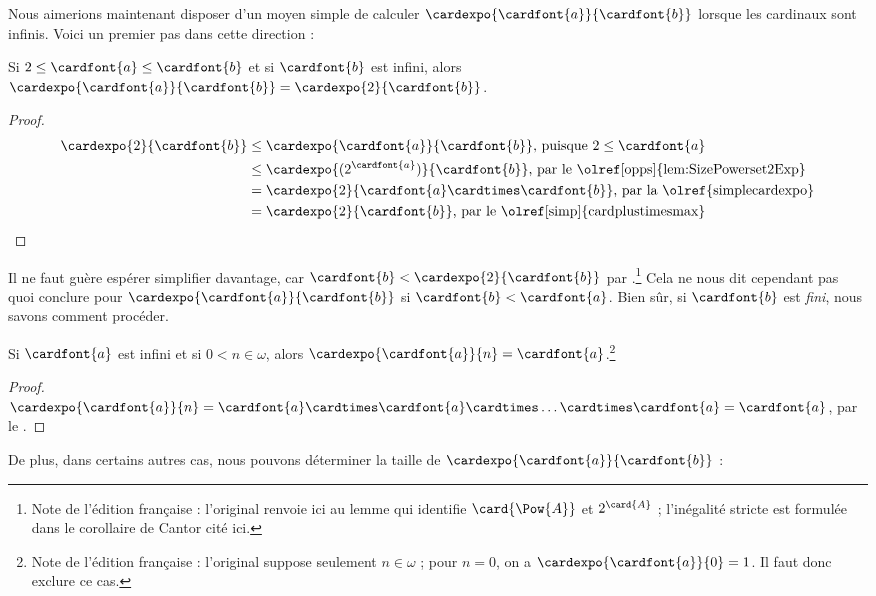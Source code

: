 \documentclass[../../../include/open-logic-section]{subfiles}
\begin{document}
Nous aimerions maintenant disposer d'un moyen
simple de calculer
$\cardexpo{\cardfont{a}}{\cardfont{b}}$
lorsque les cardinaux sont infinis.
Voici un premier pas dans cette direction :

\begin{prop}
Si $2 \leq \cardfont{a} \leq \cardfont{b}$
et si $\cardfont{b}$ est infini, alors
$\cardexpo{\cardfont{a}}{\cardfont{b}} =
\cardexpo{2}{\cardfont{b}}$.
\end{prop}

\begin{proof}
\begin{align*}
	\cardexpo{2}{\cardfont{b}} &\leq
	\cardexpo{\cardfont{a}}{\cardfont{b}}
	\text{, puisque $2 \leq \cardfont{a}$}\\
	&\leq \cardexpo{(2^\cardfont{a})}{\cardfont{b}}
	\text{, par le \olref[opps]{lem:SizePowerset2Exp}}\\
	&= \cardexpo{2}{\cardfont{a} \cardtimes \cardfont{b}}
	\text{, par la \olref{simplecardexpo}}\\
	&= \cardexpo{2}{\cardfont{b}}
	\text{, par le \olref[simp]{cardplustimesmax}}
\end{align*}
\end{proof}

Il ne faut guère espérer simplifier davantage,
car $\cardfont{b} < \cardexpo{2}{\cardfont{b}}$
par .\footnote{
Note de l'édition française : l'original renvoie ici
au lemme qui identifie
$\card{\Pow{A}}$ et $2^{\card{A}}$ ;
l'inégalité stricte est formulée dans le corollaire
de Cantor cité ici.}
Cela ne nous dit cependant pas quoi conclure
pour $\cardexpo{\cardfont{a}}{\cardfont{b}}$
si $\cardfont{b} < \cardfont{a}$.
Bien sûr, si $\cardfont{b}$ est \emph{fini},
nous savons comment procéder.

\begin{prop}
Si $\cardfont{a}$ est infini et si
$0 < n \in \omega$, alors
$\cardexpo{\cardfont{a}}{n} = \cardfont{a}$.\footnote{
Note de l'édition française : l'original suppose seulement
$n \in \omega$ ; pour $n=0$, on a
$\cardexpo{\cardfont{a}}{0}=1$.
Il faut donc exclure ce cas.}
\end{prop}

\begin{proof}
$\cardexpo{\cardfont{a}}{n}
= \cardfont{a} \cardtimes \cardfont{a}
\cardtimes \ldots \cardtimes \cardfont{a}
= \cardfont{a}$,
par le .
\end{proof}
\noindent
De plus, dans certains autres cas, nous pouvons
déterminer la taille de
$\cardexpo{\cardfont{a}}{\cardfont{b}}$ :
\end{document}
